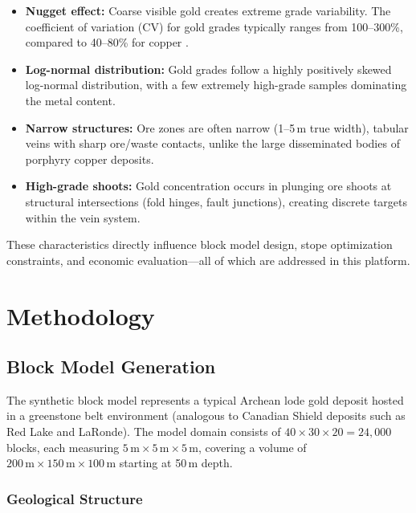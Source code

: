 \documentclass[12pt,a4paper]{article}
\begin{document}
\begin{itemize}[itemsep=0.2em]
    \item \textbf{Nugget effect:} Coarse visible gold creates extreme grade variability. The coefficient of variation (CV) for gold grades typically ranges from 100--300\%, compared to 40--80\% for copper \cite{journel1978}.
    \item \textbf{Log-normal distribution:} Gold grades follow a highly positively skewed log-normal distribution, with a few extremely high-grade samples dominating the metal content.
    \item \textbf{Narrow structures:} Ore zones are often narrow (1--5\,m true width), tabular veins with sharp ore/waste contacts, unlike the large disseminated bodies of porphyry copper deposits.
    \item \textbf{High-grade shoots:} Gold concentration occurs in plunging ore shoots at structural intersections (fold hinges, fault junctions), creating discrete targets within the vein system.
\end{itemize}

These characteristics directly influence block model design, stope optimization constraints, and economic evaluation---all of which are addressed in this platform.

\section{Methodology}
\label{sec:methodology}

\subsection{Block Model Generation}
\label{sec:block-model}

The synthetic block model represents a typical Archean lode gold deposit hosted in a greenstone belt environment (analogous to Canadian Shield deposits such as Red Lake and LaRonde). The model domain consists of $40 \times 30 \times 20 = 24{,}000$ blocks, each measuring $5\,\text{m} \times 5\,\text{m} \times 5\,\text{m}$, covering a volume of $200\,\text{m} \times 150\,\text{m} \times 100\,\text{m}$ starting at 50\,m depth.

\subsubsection{Geological Structure}
\end{document}
